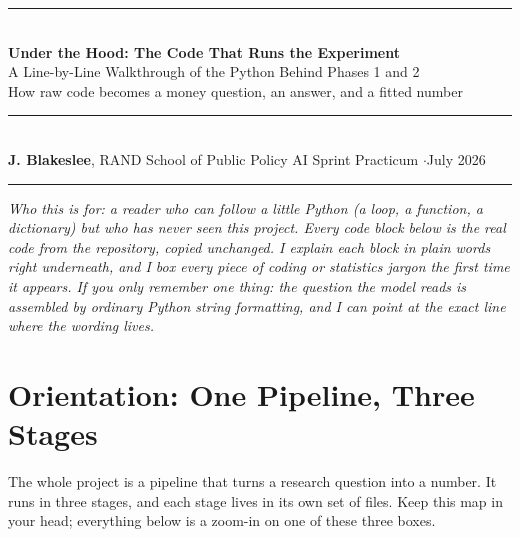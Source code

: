 \documentclass[11pt]{article}
\begin{document}
\begin{flushleft}
{\color{rulegray}\rule{\linewidth}{1.2pt}}\\[10pt]
{\LARGE\bfseries\color{ink} Under the Hood: The Code That Runs the Experiment}\\[5pt]
{\Large\color{ink} A Line-by-Line Walkthrough of the Python Behind Phases 1 and 2}\\[8pt]
{\large\color{mossdk} How raw code becomes a money question, an answer, and a fitted number}\\[11pt]
{\color{rulegray}\rule{\linewidth}{0.8pt}}\\[7pt]
{\small\color{ink}\textbf{J. Blakeslee}, RAND School of Public Policy \hfill
 AI Sprint Practicum \quad$\cdot$\quad July 2026}\\[3pt]
{\color{rulegray}\rule{\linewidth}{1.2pt}}
\end{flushleft}

\vspace{4pt}

\begin{tcolorbox}[
  colframe=moss, colback=mossbg, boxrule=0.5pt, sharp corners,
  left=12pt, right=12pt, top=9pt, bottom=9pt, before skip=2pt, after skip=12pt]
{\itshape\color{ink} Who this is for: a reader who can follow a little Python (a loop, a function, a
dictionary) but who has never seen this project. Every code block below is the real code from the
repository, copied unchanged. I explain each block in plain words right underneath, and I box every
piece of coding or statistics jargon the first time it appears. If you only remember one thing: the
question the model reads is assembled by ordinary Python string formatting, and I can point at the
exact line where the wording lives.}
\end{tcolorbox}

\section{Orientation: One Pipeline, Three Stages}

The whole project is a pipeline that turns a research question into a number. It runs in three stages,
and each stage lives in its own set of files. Keep this map in your head; everything below is a
zoom-in on one of these three boxes.
\end{document}
